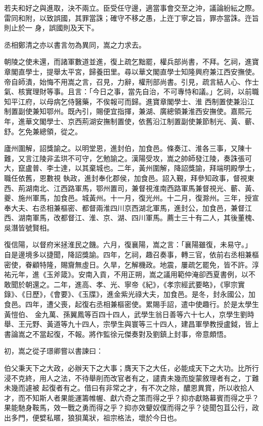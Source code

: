 \begin{pinyinscope}
 若夫和好之與進取，決不兩立。臣受任守邊，適當事會交至之沖，議論紛紜之際。雷同和附，以致誤國，其罪當誅；確守不移之愚，上迕丁寧之旨，罪亦當誅。迕旨則止於一
 身，誤國則及天下。



 丞相鄭清之亦以書言勿為異同，嵩之力求去。



 朝陵之使未還，而諸軍數道並進，復上疏乞黜罷，權兵部尚書，不拜。乞祠，進寶章閣直學士，提舉太平宮，歸養田里。尋以華文閣直學士知隆興府兼江西安撫使。帝自師潰，始悔不用嵩之言，召見，力辭，權刑部尚書。引見，疏言結人心、作士氣、核實理財等事。且言：「今日之事，當先自治，不可專恃和議。」乞祠，以前職知平江府，以母病乞侍醫藥，不俟報可而歸。進寶章閣學士、淮
 西制置使兼沿江制置副使兼知鄂州。既內引，賜便宜指揮，兼湖、廣總領兼淮西安撫使。嘉熙元年，進華文閣學士、京西荊湖安撫制置使，依舊沿江制置副使兼節制光、黃、蘄、舒。乞免兼總領，從之。



 廬州圍解，詔獎諭之。以明堂恩，進封伯，加食邑。條奏江、淮各三事，又陳十難，又言江陵非孟珙不可守，乞勉諭之。漢陽受攻，嵩之帥師發江陵，奏誅張可大，竄盧普、李士達，以其棄城也。二年，黃州圍解，降詔獎諭，拜端明殿學士，職任依舊，恩數視
 執政，進封奉化郡侯，加食邑。詔入覲，拜參知政事，督視東西、荊湖南北、江西路軍馬，鄂州置司，兼督視淮南西路軍馬兼督視光、蘄、黃、夔、施州軍馬，加食邑。城黃州。十一月，復光州。十二月，復滁州。三年，授宣奉大夫、右丞相兼樞密、都督兩淮四川京西湖北軍馬，進封公，加食邑，兼督江西、湖南軍馬，改都督江、淮、京、湖、四川軍馬。薦士三十有二人，其後董槐、吳潛皆號賢相。



 復信陽，以督府米拯淮民之饑。六月，復襄陽，嵩之言：「襄陽雖復，未易守。」
 自是邊境多以捷聞，降詔獎諭。四年，乞祠，趣召奏事，轉三官，依前右丞相兼樞密使，眷顧特隆，賜齎無虛日。久旱，乞解機政。地震，屢疏乞罷免，皆不許。淳祐元年，進《玉斧箴》。安南入貢，不用正朔，嵩之議用範仲淹卻西夏書例，以不敢聞於朝還之。二年，進高、孝、光、寧帝《紀》，《孝宗經武要略》，《寧宗實錄》、《日歷》，《會要》、《玉牒》，進金紫光祿大夫，加食邑。是冬，封永國公，加食邑。四年，遭父喪，起復右丞相兼樞密使。累賜手詔，遣中使趣行。於是太學生黃愷伯、
 金九萬、孫翼鳳等百四十四人，武學生翁日善等六十七人，京學生劉時舉、王元野、黃道等九十四人，宗學生與寰等三十四人，建昌軍學教授盧鉞，皆上書論嵩之不當起復，不報。將作監徐元傑奏對及劉鎮上封事，帝意頗悟。



 初，嵩之從子璟卿嘗以書諫曰：



 伯父秉天下之大政，必辦天下之大事；膺天下之大任，必能成天下之大功。比所行浸不克終，用人之法，不待舉削而改官者有之，譴責未幾而旋蒙敘理者有之，丁難未幾而遽被
 起復者有之。借曰有非常之才，有不次之除，醲恩異賞，所以收拾人才，而不知斯人者果能運籌帷幄、獻六奇之策而得之乎？抑亦獻賂幕賓而得之乎？果能馳身鞍馬，效一戰之勇而得之乎？抑亦效顰奴僕而得之乎？徒聞包苴公行，政出多門，便嬖私暱，狼狽萬狀，祖宗格法，壞於今日也。




\end{pinyinscope}
